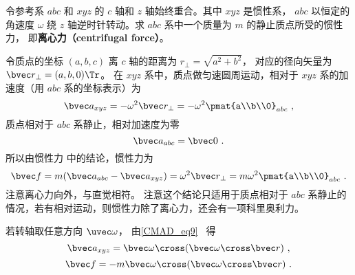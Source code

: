 
令参考系 $abc$ 和 $xyz$ 的 $c$ 轴和 $z$ 轴始终重合。其中 $xyz$ 是惯性系， $abc$ 以恒定的角速度 $\omega$ 绕 $z$ 轴逆时针转动。求 $abc$ 系中一个质量为 $m$ 的静止质点所受的惯性力， 即\textbf{离心力（centrifugal force）}。

令质点的坐标 $(a,b,c)$ 离 $c$ 轴的距离为 $r_\bot = \sqrt{a^2 + b^2}$， 对应的径向矢量为 $\bvec r_\bot = (a,b,0)\Tr$。 在 $xyz$ 系中，质点做匀速圆周运动，相对于 $xyz$ 系的加速度（用 $abc$ 系的坐标表示）为
\begin{equation}
\bvec a_{xyz} =  - \omega ^2 \bvec r_\bot =  - \omega ^2 \pmat{a\\b\\0}_{abc}~,
\end{equation}
质点相对于 $abc$ 系静止，相对加速度为零
\begin{equation}
\bvec a_{abc} = \bvec 0~.
\end{equation}
所以由惯性力 中的结论，惯性力为
\begin{equation}\label{Centri_eq3}
\bvec f = m(\bvec a_{abc} - \bvec a_{xyz}) = \omega^2\bvec r_\bot = m\omega ^2\pmat{a\\b\\0}_{abc}~.
\end{equation}
注意离心力向外，与直觉相符。 注意这个结论只适用于质点相对于 $abc$ 系静止的情况，若有相对运动，则惯性力除了离心力，还会有一项科里奥利力。

若转轴取任意方向 $\uvec\omega$， 由\autoref{CMAD_eq9}~ 得
\begin{equation}
\bvec a_{xyz} = \bvec\omega\cross (\bvec\omega\cross\bvec r)~,
\end{equation}
\begin{equation}\label{Centri_eq5}
\bvec f = -m\bvec\omega\cross (\bvec\omega\cross\bvec r)~.
\end{equation}
